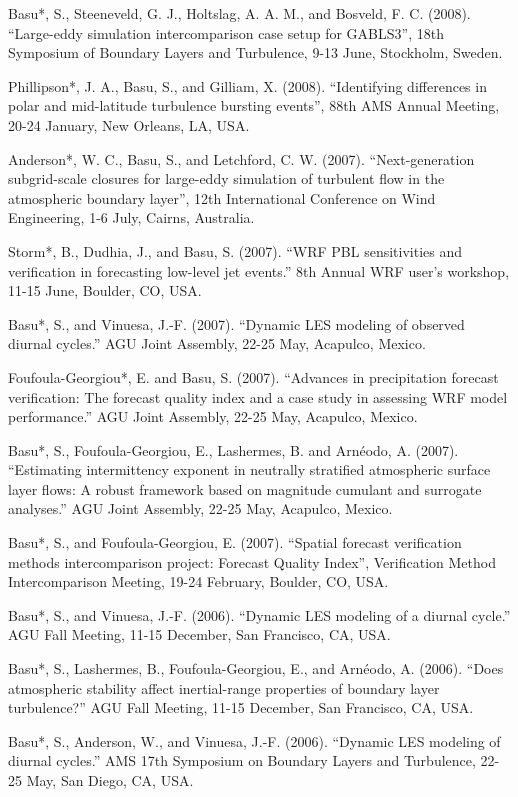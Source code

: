 \begin{etaremune}[topsep=0pt,itemsep=0pt,partopsep=0pt,parsep=0pt]
\item Basu*, S., Steeneveld, G. J., Holtslag, A. A. M., and Bosveld, F. C. (2008). ``Large-eddy simulation intercomparison case setup for GABLS3'', 18th Symposium of Boundary Layers and Turbulence, 9-13 June, Stockholm, Sweden.
\item Phillipson*, J. A., Basu, S., and Gilliam, X. (2008). ``Identifying differences in polar and mid-latitude turbulence bursting events'', 88th AMS Annual Meeting, 20-24 January, New Orleans, LA, USA.
\item Anderson*, W. C., Basu, S., and Letchford, C. W. (2007). ``Next-generation subgrid-scale closures for large-eddy simulation of turbulent flow in the atmospheric boundary layer'', 12th International Conference on Wind Engineering, 1-6 July, Cairns, Australia.
\item Storm*, B., Dudhia, J., and Basu, S. (2007). ``WRF PBL sensitivities and verification in forecasting low-level jet events.'' 8th Annual WRF user’s workshop, 11-15 June, Boulder, CO, USA.
\item Basu*, S., and Vinuesa, J.-F. (2007). ``Dynamic LES modeling of observed diurnal cycles.'' AGU Joint Assembly, 22-25 May, Acapulco, Mexico.
\item Foufoula-Georgiou*, E. and Basu, S. (2007). ``Advances in precipitation forecast verification: The forecast quality index and a case study in assessing WRF model performance.'' AGU Joint Assembly, 22-25 May, Acapulco, Mexico.
\item Basu*, S., Foufoula-Georgiou, E., Lashermes, B. and Arnéodo, A. (2007). ``Estimating intermittency exponent in neutrally stratified atmospheric surface layer flows: A robust framework based on magnitude cumulant and surrogate analyses.'' AGU Joint Assembly, 22-25 May, Acapulco, Mexico.
\item Basu*, S., and Foufoula-Georgiou, E. (2007). ``Spatial forecast verification methods intercomparison project: Forecast Quality Index'', Verification Method Intercomparison Meeting, 19-24 February, Boulder, CO, USA. 
\item Basu*, S., and Vinuesa, J.-F. (2006). ``Dynamic LES modeling of a diurnal cycle.'' AGU Fall Meeting, 11-15 December, San Francisco, CA, USA. 
\item Basu*, S., Lashermes, B., Foufoula-Georgiou, E., and Arnéodo, A. (2006). ``Does atmospheric stability affect inertial-range properties of boundary layer turbulence?'' AGU Fall Meeting, 11-15 December, San Francisco, CA, USA. 
\item Basu*, S., Anderson, W., and Vinuesa, J.-F. (2006). ``Dynamic LES modeling of diurnal cycles.'' AMS 17th Symposium on Boundary Layers and Turbulence, 22-25 May, San Diego, CA, USA.

\end{etaremune}
